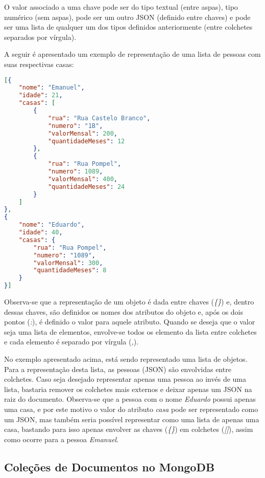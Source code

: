 O valor associado a uma chave pode ser do tipo textual (entre aspas), tipo numérico (sem aspas), pode ser um outro JSON (definido entre chaves) e pode ser uma lista de qualquer um dos tipos definidos anteriormente (entre colchetes separados por vírgula).
    
A seguir é apresentado um exemplo de representação de uma lista de pessoas com suas respectivas casas:

\newpage

\begin{lstlisting}[language=json, caption={JSON Representando Uma Lista de Pessoas Com Suas Casas}]
[{
    "nome": "Emanuel",
    "idade": 21,
    "casas": [
        {
            "rua": "Rua Castelo Branco",
            "numero": "1B",
            "valorMensal": 200,
            "quantidadeMeses": 12
        },
        {
            "rua": "Rua Pompel",
            "numero": 1089,
            "valorMensal": 400,
            "quantidadeMeses": 24
        }
    ]
},
{
    "nome": "Eduardo",
    "idade": 40,
    "casas": {
        "rua": "Rua Pompel",
        "numero": "1089",
        "valorMensal": 300,
        "quantidadeMeses": 8
    }
}]
\end{lstlisting}

Observa-se que a representação de um objeto é dada entre chaves (\textit{\{\}}) e, dentro dessas chaves, são definidos os nomes dos atributos do objeto e, após os dois pontos (\textit{:}), é definido o valor para aquele atributo. Quando se deseja que o valor seja uma lista de elementos, envolve-se todos os elemento da lista entre colchetes e cada elemento é separado por vírgula (\textit{,}).
    
No exemplo apresentado acima, está sendo representado uma lista de objetos. Para a representação desta lista, as pessoas (JSON) são envolvidas entre colchetes. Caso seja desejado representar apenas uma pessoa ao invés de uma lista, bastaria remover os colchetes mais externos e deixar apenas um JSON na raiz do documento. Observa-se que a pessoa com o nome \textit{Eduardo} possui apenas uma casa, e por este motivo o valor do atributo \textit{casa} pode ser representado como um JSON, mas também seria possível representar como uma lista de apenas uma casa, bastando para isso apenas envolver as chaves (\textit{\{\}}) em colchetes (\textit{[]}), assim como ocorre para a pessoa \textit{Emanuel}.

\subsection{Coleções de Documentos no MongoDB}
    
